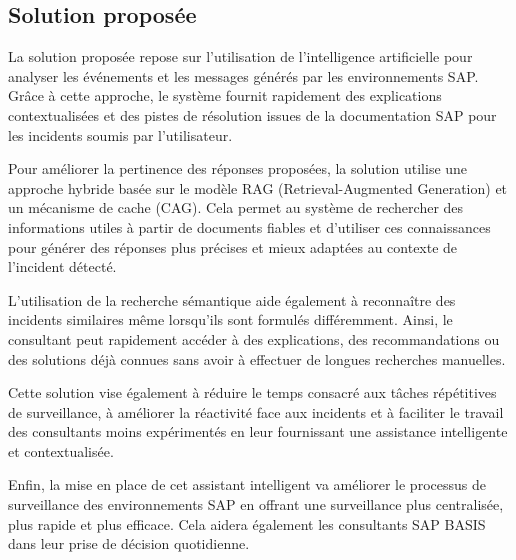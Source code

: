 \subsection{Solution proposée}
La solution proposée repose sur l'utilisation de l'intelligence artificielle pour analyser les événements et les messages générés par les environnements SAP. Grâce à cette approche, le système fournit rapidement des explications contextualisées et des pistes de résolution issues de la documentation SAP pour les incidents soumis par l'utilisateur.

Pour améliorer la pertinence des réponses proposées, la solution utilise une approche hybride basée sur le modèle RAG (Retrieval-Augmented Generation) et un mécanisme de cache (CAG). Cela permet au système de rechercher des informations utiles à partir de documents fiables et d'utiliser ces connaissances pour générer des réponses plus précises et mieux adaptées au contexte de l'incident détecté.

L'utilisation de la recherche sémantique aide également à reconnaître des incidents similaires même lorsqu'ils sont formulés différemment. Ainsi, le consultant peut rapidement accéder à des explications, des recommandations ou des solutions déjà connues sans avoir à effectuer de longues recherches manuelles.

Cette solution vise également à réduire le temps consacré aux tâches répétitives de surveillance, à améliorer la réactivité face aux incidents et à faciliter le travail des consultants moins expérimentés en leur fournissant une assistance intelligente et contextualisée.

Enfin, la mise en place de cet assistant intelligent va améliorer le processus de surveillance des environnements SAP en offrant une surveillance plus centralisée, plus rapide et plus efficace. Cela aidera également les consultants SAP BASIS dans leur prise de décision quotidienne.

